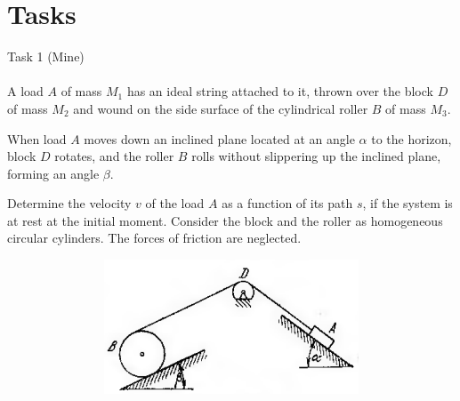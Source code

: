 \documentclass[aspectratio=169]{beamer}
\begin{document}
\section*{Tasks}
\begin{frame}[t]{Task 1 (Mine)}
    \framesubtitle{}
    \small
    A load $A$ of mass $M_1$ has an ideal string attached to it, thrown over the block $D$ of mass $M_2$ and wound on the side surface of the cylindrical roller $B$ of mass $M_3$. 
    \begin{minipage}{0.55\textwidth}

    When load $A$ moves down an inclined plane located at an angle $\alpha$ to the horizon, block $D$ rotates, and the roller $B$ rolls without slippering up the inclined plane, forming an angle $ \beta$.
    \medskip
    
    Determine the velocity $v$ of the load $A$ as a function of its path $s$, if the system is at rest at the initial moment. Consider the block and the roller as homogeneous circular cylinders. The forces of friction are neglected.
    \end{minipage}
    \begin{minipage}{0.44\textwidth}
        \begin{figure}[H]
            \centering\includegraphics[height=4cm,width=1\textwidth,keepaspectratio]{lab12_1.png}
        \end{figure}
    \end{minipage}
    \end{frame}
\end{document}
